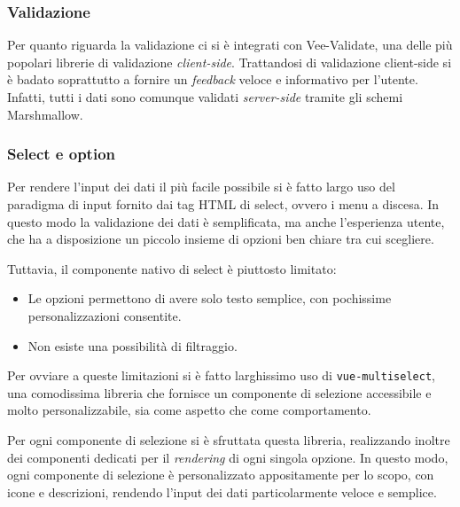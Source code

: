 \subsubsection{Validazione}
Per quanto riguarda la validazione ci si è integrati con Vee-Validate, una delle più popolari librerie di validazione \emph{client-side}. Trattandosi di validazione client-side si è badato soprattutto a fornire un \emph{feedback} veloce e informativo per l'utente. Infatti, tutti i dati sono comunque validati \emph{server-side} tramite gli schemi Marshmallow.

\subsubsection{Select e option}
Per rendere l'input dei dati il più facile possibile si è fatto largo uso del paradigma di input fornito dai tag HTML di select, ovvero i menu a discesa. In questo modo la validazione dei dati è semplificata, ma anche l'esperienza utente, che ha a disposizione un piccolo insieme di opzioni ben chiare tra cui scegliere.

Tuttavia, il componente nativo di select è piuttosto limitato:
\begin{itemize}
    \item Le opzioni permettono di avere solo testo semplice, con pochissime personalizzazioni consentite.
    \item Non esiste una possibilità di filtraggio.
\end{itemize}
Per ovviare a queste limitazioni si è fatto larghissimo uso di \texttt{vue-multiselect}, una comodissima libreria che fornisce un componente di selezione accessibile e molto personalizzabile, sia come aspetto che come comportamento.

Per ogni componente di selezione si è sfruttata questa libreria, realizzando inoltre dei componenti dedicati per il \emph{rendering} di ogni singola opzione. In questo modo, ogni componente di selezione è personalizzato appositamente per lo scopo, con icone e descrizioni, rendendo l'input dei dati particolarmente veloce e semplice.